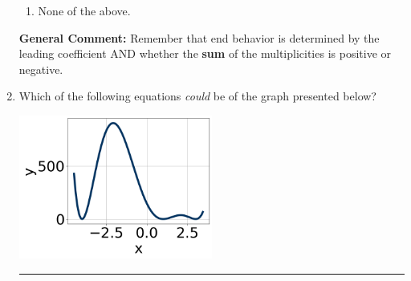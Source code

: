 \documentclass{extbook}[14pt]
\newcommand{\litem}[1]{\item #1

\rule{\textwidth}{0.4pt}}
\begin{document}
\begin{enumerate}
{\begin{enumerate}[label=\Alph*.]
\item None of the above.\end{enumerate}
\textbf{General Comment:} Remember that end behavior is determined by the leading coefficient AND whether the \textbf{sum} of the multiplicities is positive or negative.
}
\litem{
Which of the following equations \textit{could} be of the graph presented below?

\begin{center}
    \includegraphics[width=0.5\textwidth]{../Figures/polyGraphToFunctionCopyC.png}
\end{center}


}
\end{enumerate}
\end{document}
